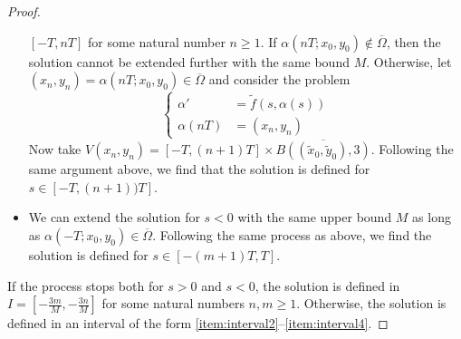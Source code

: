 \begin{proof}
\begin{itemize}[topsep=0pt]
		$[-T, nT]$ for some natural number $n \geq 1$. If $\alpha(n T; x_0, y_0)
		\not\in \overline{\Omega}$, then the solution cannot be extended further
		with the same bound $M$. Otherwise, let $(x_n, y_n) = \alpha(n T; x_0,
		y_0) \in \overline{\Omega}$ and consider the problem
		\[
			\left\{
				\begin{aligned}
					\alpha' 	&= \tilde{f}(s,\alpha(s)) \\
					\alpha(n T) &= (x_n, y_n)
				\end{aligned}	
			\right.	
		\]
		Now take $V(x_n, y_n) = [-T,(n+1)T] \times \overline{B((\tilde{x}_0,
		\tilde{y}_0),3)}$. Following the same argument above, we find that the
		solution is defined for $s \in [-T, (n+1))T]$.
		\item We can extend the solution for $s < 0$ with the same upper bound
		$M$ as long as $\alpha(-T; x_0, y_0) \in \overline{\Omega}$. Following
		the same process as above, we find the solution is defined for $s \in
		[-(m+1)T, T]$.
	\end{itemize}
	\noindent
	If the process stops both for $s > 0$ and $s < 0$, the solution is defined
	in $I = \left[-\frac{3 m}{M}, -\frac{3 n}{M}\right]$ for some natural
	numbers $n, m \geq 1$. Otherwise, the solution is defined in an interval of
	the form \ref{item:interval2}--\ref{item:interval4}.
\end{proof}

